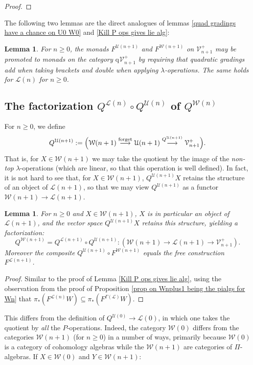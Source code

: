 \documentclass[11pt]{amsart} \renewcommand{\baselinestretch}{1.2}
\theoremstyle{plain}
\newtheorem{lem}[thm]{Lemma}
\numberwithin{equation}{section} %
\theoremstyle{plain}
\newtheorem{lem}[thm]{Lemma}
\numberwithin{equation}{chapter} %
\renewcommand{\to}{\longrightarrow}
\newcommand{\scrL}{\mathscr{L}}
\newcommand{\calU}{\mathcal{U}}
\newcommand{\calL}{\mathcal{L}}
\newcommand{\calV}{\mathcal{V}}
\newcommand{\calw}{\mathcal{W}}
\newcommand{\call}{\mathcal{L}}
\newcommand{\LieOperad}{{\scrL}}
\newcommand{\vect}[2]{\calV^{#1}_{#2}}
\newcommand{\quadgrad}[1]{\mathrm{q}_{#1}}
\newcommand{\SubsectionOrSection}[1]{\subsection{#1}}
\begin{document}
\begin{homotopy operations for PRLs}
\begin{proof}
\end{proof}
The following two lemmas are the direct analogues of lemmas \ref{quad gradings have a chance on U0 W0} and \ref{Kill P ops gives lie alg}:
\begin{lem}
\label{quad gradings have a chance on Un Wn}
For $n\geq0$, the monads $F^{\calU(n+1)}$ and $F^{\calw(n+1)}$ on $\vect{+}{n+1}$ may be promoted to monads on the category $\quadgrad{}\vect{+}{n+1}$ by requiring that quadratic gradings add when taking brackets and double when applying $\lambda$-operations. The same holds for $\call(n)$ for $n\geq0$.
\end{lem}
\SubsectionOrSection{The factorization $Q^{\calL(n)}\circ Q^{\calU(n)}$ of $Q^{\calw(n)}$}
For $n\geq0$, we define
\[Q^{\calU(n+1)}:=\Bigl(\calw(n+1)\overset{\textup{forget}}{\to}\calU(n+1)\overset{Q^{\calU(n+1)}}{\to}\vect{+}{n+1}\Bigr).\]
That is, for $X\in\calw(n+1)$ we may take the quotient by the image of the \emph{non-top} $\lambda$-operations (which are linear, so that this operation is well defined). In fact, it is not hard to see that, for $X\in\calw(n+1)$, $Q^{\calU(n+1)}X$ retains the structure of an object of $\calL(n+1)$, so that we may view $Q^{\calU(n+1)}$ as a functor $\calw(n+1)\to \calL(n+1)$.
\begin{lem}
\label{Kill lambda ops gives lie alg}
For $n\geq0$ and $X\in\calw(n+1)$, $X$ is in particular an object of $\calL(n+1)$, and the vector space $Q^{\calU(n+1)}X$ retains this structure, yielding a factorization:%
\[Q^{\calw(n+1)}=Q^{\calL(n+1)}\circ Q^{\calU(n+1)}:\left(\calw(n+1)\to \calL(n+1)\to \vect{+}{n+1}\right).\]
Moreover the composite $Q^{\calU(n+1)}\circ F^{\calw(n+1)}$ equals the free construction $F^{\calL(n+1)}$.
\end{lem}
\begin{proof}
Similar to the proof of Lemma \ref{Kill P ops gives lie alg}, using the observation from the proof of Proposition \ref{prop on Wnplus1 being the pialgs for Wn} that $\pi_*(F^{\calL(n)}W)\subseteq\pi_*(F^{\Gamma(\LieOperad)}W)$.
\end{proof}
This differs from the definition of $Q^{\calU(0)}\to \calL(0)$, in which one takes the quotient by \emph{all} the $P$-operations.
Indeed, the category $\calw(0)$ differs from the categories $\calw(n+1)$ (for $n\geq0$) in a number of ways, primarily because $\calw(0)$ is a category of cohomology algebras while the $\calw(n+1)$ are categories of $\Pi$-algebras. If $X\in\calw(0)$ and $Y\in \calw(n+1) $:

\end{homotopy operations for PRLs}
\end{document}
